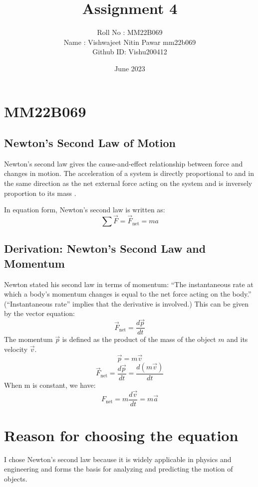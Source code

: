 \documentclass{article}
\title{Assignment 4}
\author{Roll No : MM22B069 \\ Name : Vishwajeet Nitin Pawar mm22b069 \\ Github ID: Vishu200412}
\date{June 2023}
\begin{document}
\maketitle
\begin{center}
    
\end{center}
\section*{MM22B069}
\subsection*{Newton's Second Law of Motion}
Newton's second law gives the cause-and-effect relationship between force and changes in motion. The acceleration of a system is directly proportional to and in the same direction as the net external force acting on the system and is inversely proportion to its mass  \cite{Newton}.

\noindent 
In equation form, Newton’s second law is written as:
\[\sum \vec{F} = \vec{F}_{\text{net}} = ma\]
\subsection*{Derivation: Newton’s Second Law and Momentum}
Newton stated his second law in terms of momentum: “The instantaneous rate at which a body’s momentum changes is equal to the net force acting on the body.” (“Instantaneous rate” implies that the derivative is involved.) This can be given by the vector equation:
\[\vec{F}_{\text{net}} = \frac{d\vec{p}}{dt}\]
The momentum \(\vec{p}\) is defined as the product of the mass of the object \(m\) and its velocity \(\vec{v}\).
\[\vec{p} = m\vec{v}\]
\[\vec{F}_{\text{net}} = \frac{d\vec{p}}{dt} = \frac{d(m\vec{v})}{dt}\]
When m is constant, we have:
\[F_{\text{net}} = m\frac{d\vec{v}}{dt} = m\vec{a}\]
\section*{Reason for choosing the equation}
I chose Newton's second law because it is widely applicable in physics and engineering and forms the basis for analyzing and predicting the motion of objects.

\newpage
\printbibliography
\end{document}
